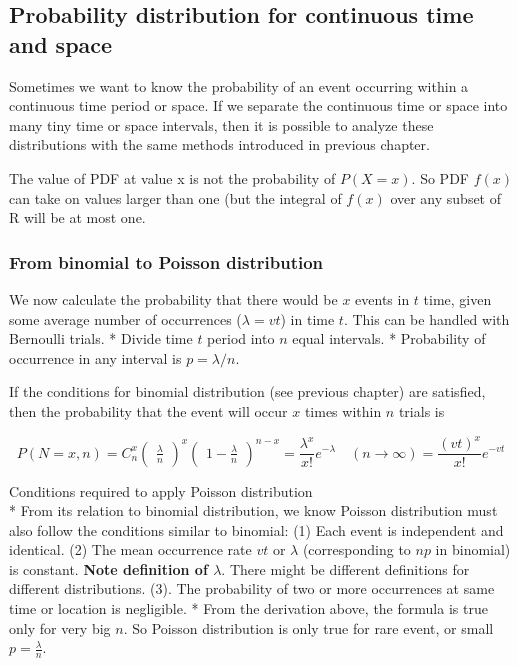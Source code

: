 \documentclass[11pt]{article}
\begin{document}
    \subsection{Probability distribution for continuous time and
space}\label{probability-distribution-for-continuous-time-and-space}

Sometimes we want to know the probability of an event occurring within a
continuous time period or space. If we separate the continuous time or
space into many tiny time or space intervals, then it is possible to
analyze these distributions with the same methods introduced in previous
chapter.

The value of PDF at value x is not the probability of \(P(X=x)\). So PDF
\(f(x)\) can take on values larger than one (but the integral of
\(f(x)\) over any subset of R will be at most one.

\subsubsection{From binomial to Poisson
distribution}\label{from-binomial-to-poisson-distribution}

We now calculate the probability that there would be \(x\) events in
\(t\) time, given some average number of occurrences (\(\lambda = vt\))
in time \(t\). This can be handled with Bernoulli trials. * Divide time
\(t\) period into \(n\) equal intervals. * Probability of occurrence in
any interval is \(p = \lambda / n\).

If the conditions for binomial distribution (see previous chapter) are
satisfied, then the probability that the event will occur \(x\) times
within \(n\) trials is

\[ P(N=x,n) = C_n^x \begin{pmatrix}\frac{\lambda}{n}\end{pmatrix}^x\begin{pmatrix}1-\frac{\lambda}{n}\end{pmatrix}^{n-x} =\frac{\lambda^x}{x!}e^{-\lambda} \quad(n\rightarrow \infty) = \frac{(vt)^x}{x!}e^{-vt}\]

Conditions required to apply Poisson distribution\\
* From its relation to binomial distribution, we know Poisson
distribution must also follow the conditions similar to binomial: (1)
Each event is independent and identical. (2) The mean occurrence rate
\(vt\) or \(\lambda\) (corresponding to \(np\) in binomial) is constant.
\textbf{Note definition of \(\lambda\)}. There might be different
definitions for different distributions. (3). The probability of two or
more occurrences at same time or location is negligible. * From the
derivation above, the formula is true only for very big \(n\). So
Poisson distribution is only true for rare event, or small
\(p = \frac{\lambda}{n}\).
\end{document}
